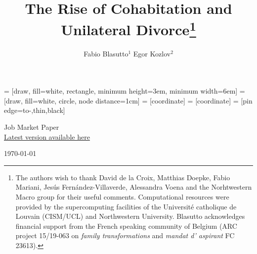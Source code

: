 \documentclass[12pt]{article}
\title{The Rise of Cohabitation and Unilateral Divorce\thanks{The authors wish to thank David de la Croix, Matthias Doepke, Fabio Mariani, Jesús Fernández-Villaverde, Alessandra Voena and the Norhtwestern Macro group for their useful comments. Computational resources were provided by the supercomputing facilities of the Université catholique de Louvain (CISM/UCL) and Northwestern University. Blasutto acknowledges financial support from the French speaking community of Belgium (ARC project 15/19-063 on \textit{family transformations} and \textit{mandat d' aspirant} FC 23613).}}
\author{\large Fabio Blasutto$^1$ \quad Egor Kozlov$^2$}
\date{}
\numberwithin{table}{section}
\begin{document}
	 	 = [draw, fill=white, rectangle, 
	minimum height=3em, minimum width=6em]
	 = [draw, fill=white, circle, node distance=1cm]
	 = [coordinate]
	 = [coordinate]
	 = [pin edge={to-,thin,black}]
	
	
	
	
	\maketitle
	
\vspace{-2cm}
\begin{center}\large	
	Job Market Paper\\
	\href{https://drive.google.com/file/d/1utFkMPdUR5yb07oyJI7Vx1BJDLfYgMHi/view?usp=sharing}{Latest version available here}
\end{center}
\begin{center}\large
	\today
\end{center}



	
\end{document}
